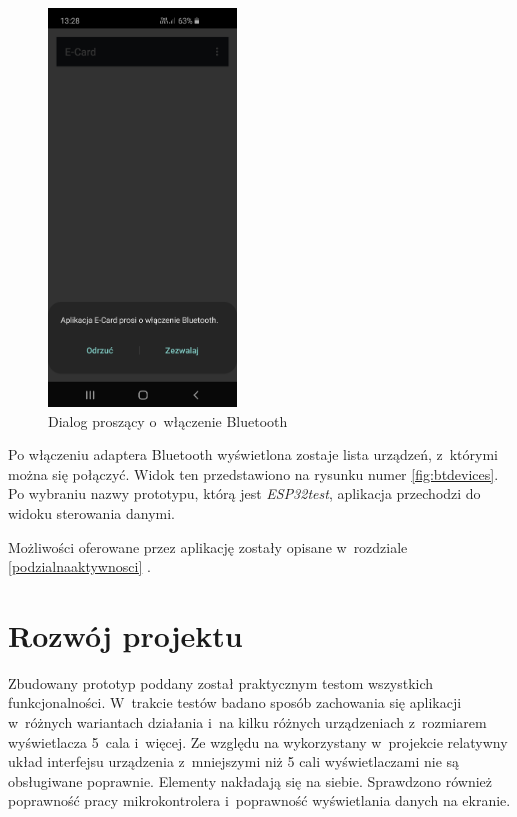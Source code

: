 \documentclass[a4paper,12pt, twoside]{article}
\begin{document}
    	\begin{figure}[H]
    	        \centering
    			\includegraphics[width=5cm]{images/rys_13bluetoothdialog.jpg}
    			\caption{Dialog proszący o~włączenie Bluetooth}
                \label{fig:bton}
    	\end{figure}
    	
    	Po włączeniu adaptera Bluetooth wyświetlona zostaje lista urządzeń, z~którymi można się połączyć. Widok ten przedstawiono na rysunku numer \ref{fig:btdevices}. Po wybraniu nazwy prototypu, którą jest \textit{ESP32test}, aplikacja przechodzi do widoku sterowania danymi.
    	
    	Możliwości oferowane przez aplikację zostały opisane w~rozdziale \ref{podzialnaaktywnosci} \textit{}.
    	
    	\newpage
    	\section{Rozwój projektu}
    	Zbudowany prototyp poddany został praktycznym testom wszystkich funkcjonalności. W~trakcie testów badano sposób zachowania się aplikacji w~różnych wariantach działania i~na kilku różnych urządzeniach z~rozmiarem wyświetlacza 5~cala i~więcej. Ze względu na wykorzystany w~projekcie relatywny układ interfejsu urządzenia z~mniejszymi niż 5 cali wyświetlaczami nie są obsługiwane poprawnie. Elementy nakładają się na siebie. Sprawdzono również poprawność pracy mikrokontrolera i~poprawność wyświetlania danych na ekranie.
    	
\end{document}
